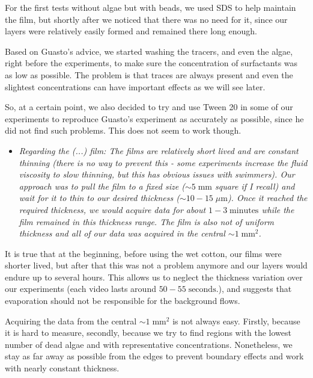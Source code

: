 For the first tests without algae but with beads, we used SDS to help maintain the film, but shortly after we noticed that there was no need for it, since our layers were relatively easily formed and remained there long enough.

Based on Guasto's advice, we started washing the tracers, and even the algae, right before the experiments, to make sure the concentration of surfactants was as low as possible. The problem is that traces are always present and even the slightest concentrations can have important effects as we will see later.

So, at a certain point, we also decided to try and use Tween 20 in some of our experiments to reproduce Guasto's experiment as accurately as possible, since he did not find such problems. This does not seem to work though.

\begin{itemize}
	\item \textit{Regarding the (...) film: The films are relatively short lived and are constant thinning (there is no way to prevent this - some experiments increase the fluid viscosity to slow thinning, but this has obvious issues with swimmers). Our approach was to pull the film to a fixed size ($ \sim 5 \; \textrm{mm}$ square if I recall) and wait for it to thin to our desired thickness ($ \sim 10-15 \; \mu \textrm{m} $). Once it reached the required thickness, we would acquire data for about $1-3 \; \textrm{minutes}$ while the film remained in this thickness range. The film is also not of uniform thickness and all of our data was acquired in the central $ \sim 1 \; \textrm{mm}^2 $.}
\end{itemize}

It is true that at the beginning, before using the wet cotton, our films were shorter lived, but after that this was not a problem anymore and our layers would endure up to several hours. This allows us to neglect the thickness variation over our experiments (each video lasts around $50-55 \; \textrm{seconds}$.), and suggests that evaporation should not be responsible for the background flows.

Acquiring the data from the central $ \sim 1 \; \textrm{mm}^2 $ is not always easy. Firstly, because it is hard to measure, secondly, because we try to find regions with the lowest number of dead algae and with representative concentrations. Nonetheless, we stay as far away as possible from the edges to prevent boundary effects and work with nearly constant thickness.

